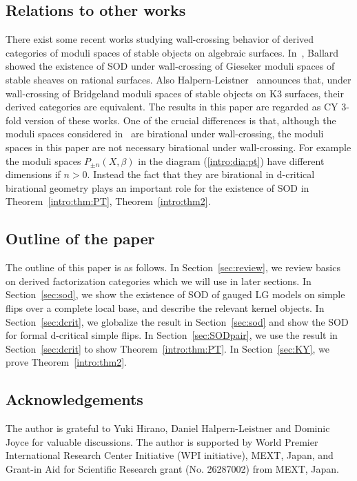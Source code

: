 \documentclass[11pt]{amsart}
\theoremstyle{plain}
\begin{document}
\subsection{Relations to other works}
There exist some recent works studying 
wall-crossing behavior of derived categories of moduli spaces of 
stable objects on algebraic surfaces. 
In~\cite{MR3652079}, Ballard showed the existence of SOD 
under wall-crossing of Gieseker moduli spaces of 
stable sheaves on rational surfaces. 
Also Halpern-Leistner~\cite{HalpK3} announces
that, under wall-crossing of Bridgeland moduli spaces of 
stable objects on K3 surfaces, their derived 
categories are equivalent. The results in this paper
are regarded as CY 3-fold version of these works. 
One of the crucial differences is that, although the 
moduli spaces considered in~\cite{MR3652079, HalpK3} are 
birational under wall-crossing, 
the moduli spaces in this paper are not necessary birational 
under wall-crossing. 
For example the moduli spaces $P_{\pm n}(X, \beta)$
in the diagram (\ref{intro:dia:pt})
have different dimensions if $n>0$. 
Instead the fact that they are birational in d-critical 
birational geometry plays an important role for the 
existence of SOD in Theorem~\ref{intro:thm:PT}, Theorem~\ref{intro:thm2}. 






\subsection{Outline of the paper}
The outline of this paper is as follows. 
In Section~\ref{sec:review}, we review basics on 
derived factorization categories which we will use 
in later sections. 
In Section~\ref{sec:sod}, we show 
the existence of SOD of gauged LG models 
on simple flips over a complete local base, and 
describe the relevant kernel objects. 
In Section~\ref{sec:dcrit}, we globalize the result in 
Section~\ref{sec:sod} and show the SOD for formal 
d-critical simple flips. 
In Section~\ref{sec:SODpair}, we use the result in Section~\ref{sec:dcrit}
to show Theorem~\ref{intro:thm:PT}. 
In Section~\ref{sec:KY}, we prove Theorem~\ref{intro:thm2}. 

\subsection{Acknowledgements}
The author is grateful to Yuki Hirano, 
Daniel Halpern-Leistner
and Dominic Joyce for valuable discussions.
The author is supported by World Premier International Research Center
Initiative (WPI initiative), MEXT, Japan, and Grant-in Aid for Scientific
Research grant (No. 26287002) from MEXT, Japan.
\end{document}
